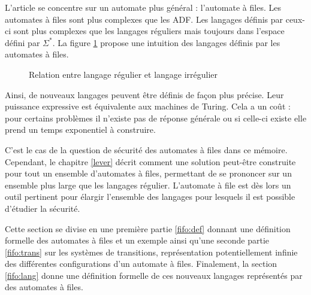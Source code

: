 L'article \cite{Vardhan04} se concentre sur un automate plus général : l'automate à files. Les automates à files sont plus complexes que les ADF. Les langages définis par ceux-ci sont plus complexes que les langages réguliers mais toujours dans l'espace défini par $\Sigma^*$. La figure \ref{fig:lrl} propose une intuition des langages définis par les automates à files.


\begin{figure}[H]
  \centering
  \caption{Relation entre langage régulier et langage irrégulier}\label{fig:lrl}
\end{figure}

Ainsi, de nouveaux langages peuvent être définis de façon plus précise. Leur puissance expressive est équivalente aux machines de Turing. Cela a un coût : pour certains problèmes il n'existe pas de réponse générale ou si celle-ci existe elle prend un temps exponentiel à construire.


C'est le cas de la question de sécurité des automates à files dans ce mémoire. Cependant, le chapitre \ref{lever} décrit comment une solution peut-être construite pour tout un ensemble d'automates à files, permettant de se prononcer sur un ensemble plus large que les langages régulier. L'automate à file est dès lors un outil pertinent pour élargir l'ensemble des langages pour lesquels il est possible d'étudier la sécurité.

Cette section se divise en une première partie \ref{fifo:def} donnant une définition formelle des automates à files et un exemple ainsi qu'une seconde partie \ref{fifo:trans} sur les systèmes de transitions, représentation potentiellement infinie des différentes configurations d'un automate à files. Finalement, la section \ref{fifo:lang} donne une définition formelle de ces nouveaux langages représentés par des automates à files.



